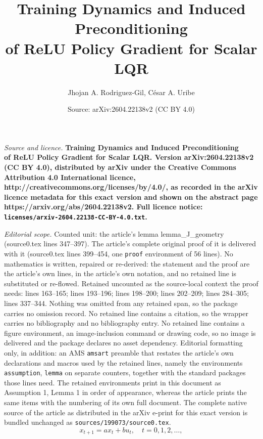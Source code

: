 \documentclass[10pt,a4paper]{amsart}
\title{\LARGE \bf Training Dynamics and Induced Preconditioning \\ of ReLU Policy Gradient for Scalar LQR}
\author{Jhojan A. Rodriguez-Gil, C\'esar A. Uribe}
\date{Source: arXiv:2604.22138v2 (CC BY 4.0)}
\begin{document}
\maketitle

\noindent\emph{Source and licence.} \LARGE \bf Training Dynamics and Induced Preconditioning \\ of ReLU Policy Gradient for Scalar LQR. Version arXiv:2604.22138v2 (CC BY 4.0), distributed by arXiv under the Creative Commons Attribution 4.0 International licence, http://creativecommons.org/licenses/by/4.0/, as recorded in the arXiv licence metadata for this exact version and shown on the abstract page https://arxiv.org/abs/2604.22138v2. Full licence notice: \texttt{licenses/arxiv-2604.22138-CC-BY-4.0.txt}.\par\smallskip

\noindent\textit{Editorial scope.} Counted unit: the article's lemma lemma\_J\_geometry (source0.tex lines 347--397). The article's complete original proof of it is delivered with it (source0.tex lines 399--454, one \texttt{proof} environment of 56 lines). No mathematics is written, repaired or re-derived: the statement and the proof are the article's own lines, in the article's own notation, and no retained line is substituted or re-flowed.  Retained uncounted as the source-local context the proof needs: lines 163--165; lines 193--196; lines 198--200; lines 202--209; lines 284--305; lines 337--344.  Nothing was omitted from any retained span, so the package carries no omission record.  No retained line contains a citation, so the wrapper carries no bibliography and no bibliography entry.  No retained line contains a figure environment, an image-inclusion command or drawing code, so no image is delivered and the package declares no asset dependency.  Editorial formatting only, in addition: an AMS \texttt{amsart} preamble that restates the article's own declarations and macros used by the retained lines, namely the environments \texttt{assumption}, \texttt{lemma} on separate counters, together with the standard packages those lines need.  The retained environments print in this document as Assumption 1, Lemma 1 in order of appearance, whereas the article prints the same items with the numbering of its own full document.  The complete native source of the article as distributed in the arXiv e-print for this exact version is bundled unchanged as \texttt{sources/199073/source0.tex}.
\begin{equation} \label{eq_dynamics}
    x_{t+1} = a x_t + b u_t, \quad t=0,1,2,\dots,
\end{equation}
\end{document}
